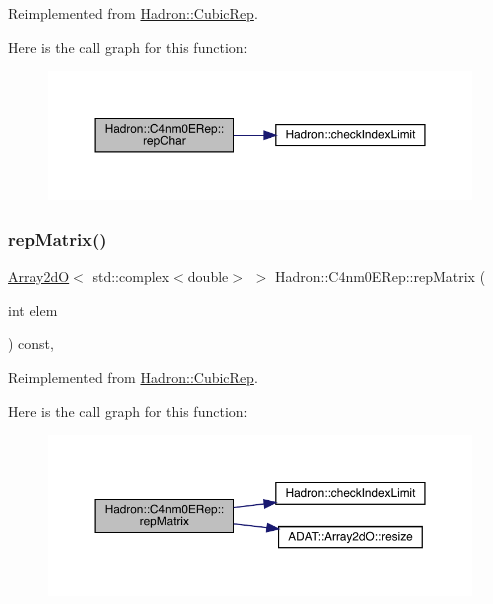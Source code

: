 Reimplemented from \mbox{\hyperlink{structHadron_1_1CubicRep_af45227106e8e715e84b0af69cd3b36f8}{Hadron\+::\+Cubic\+Rep}}.

Here is the call graph for this function\+:
\nopagebreak
\begin{figure}[H]
\begin{center}
\leavevmode
\includegraphics[width=350pt]{d3/d8a/structHadron_1_1C4nm0ERep_ae2587ec63f886eaafedfaede40ebdba5_cgraph}
\end{center}
\end{figure}
\mbox{\label{structHadron_1_1C4nm0ERep_aa9353c0f2a226224911c51db6f647ccf}} 
\subsubsection{\texorpdfstring{repMatrix()}{repMatrix()}\hspace{0.1cm}{\footnotesize\ttfamily [1/2]}}
{\footnotesize\ttfamily \mbox{\hyperlink{classADAT_1_1Array2dO}{Array2dO}}$<$ std\+::complex$<$double$>$ $>$ Hadron\+::\+C4nm0\+E\+Rep\+::rep\+Matrix (\begin{DoxyParamCaption}\item[{int}]{elem }\end{DoxyParamCaption}) const\hspace{0.3cm}{\ttfamily [inline]}, {\ttfamily [virtual]}}



Reimplemented from \mbox{\hyperlink{structHadron_1_1CubicRep_ac5d7e9e6f4ab1158b5fce3e4ad9e8005}{Hadron\+::\+Cubic\+Rep}}.

Here is the call graph for this function\+:
\nopagebreak
\begin{figure}[H]
\begin{center}
\leavevmode
\includegraphics[width=350pt]{d3/d8a/structHadron_1_1C4nm0ERep_aa9353c0f2a226224911c51db6f647ccf_cgraph}
\end{center}
\end{figure}
\mbox{\label{structHadron_1_1C4nm0ERep_aa9353c0f2a226224911c51db6f647ccf}} 
